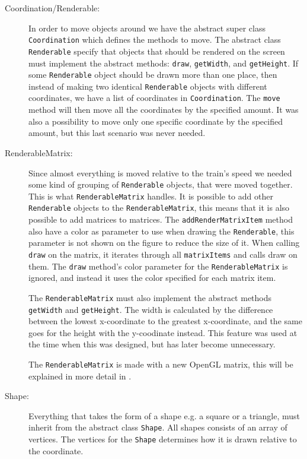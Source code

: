 \begin{description}
\item[Coordination/Renderable:] In order to move objects around we have the abstract super class \lstinline|Coordination| which defines the methods to move. The abstract class \lstinline|Renderable| specify that objects that should be rendered on the screen must implement the abstract methods: \lstinline|draw|, \lstinline|getWidth|, and \lstinline|getHeight|. If some \lstinline|Renderable| object should be drawn more than one place, then instead of making two identical \lstinline|Renderable| objects with different coordinates, we have a list of coordinates in \lstinline|Coordination|. The \lstinline|move| method will then move all the coordinates by the specified amount. It was also a possibility to move only one specific coordinate by the specified amount, but this last scenario was never needed.

\item[RenderableMatrix:] Since almost everything is moved relative to the train's speed we needed some kind of grouping of \lstinline|Renderable| objects, that were moved together. This is what \lstinline|RenderableMatrix| handles. It is possible to add other \lstinline|Renderable| objects to the \lstinline|RenderableMatrix|, this means that it is also possible to add matrices to matrices. The \lstinline|addRenderMatrixItem| method also have a color as parameter to use when drawing the \lstinline|Renderable|, this parameter is not shown on the figure to reduce the size of it. When calling \lstinline|draw| on the matrix, it iterates through all \lstinline|matrixItems| and calls draw on them. The \lstinline|draw| method's color parameter for the \lstinline|RenderableMatrix| is ignored, and instead it uses the color specified for each matrix item.

The \lstinline|RenderableMatrix| must also implement the abstract methods \lstinline|getWidth| and \lstinline|getHeight|. The width is calculated by the difference between the lowest x-coordinate to the greatest x-coordinate, and the same goes for the height with the y-coodinate instead. This feature was used at the time when this was designed, but has later become unnecessary.

The \lstinline|RenderableMatrix| is made with a new OpenGL matrix, this will be explained in more detail in .

\item[Shape:] Everything that takes the form of a shape e.g. a square or a triangle, must inherit from the abstract class \lstinline|Shape|. All shapes consists of an array of vertices. The vertices for the \lstinline|Shape| determines how it is drawn relative to the coordinate.


\end{description}
